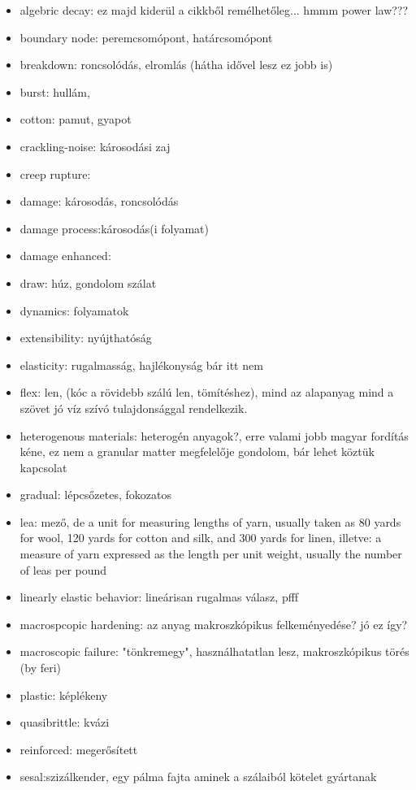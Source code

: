 \begin{itemize}
\item algebric decay: ez majd kiderül a cikkből remélhetőleg...	hmmm power law???
\item boundary node: peremcsomópont, határcsomópont
\item breakdown: roncsolódás, elromlás (hátha idővel lesz ez jobb is)
\item burst: hullám,
\item cotton: pamut, gyapot
\item crackling-noise: károsodási zaj
\item creep rupture:
\item damage: károsodás, roncsolódás
\item damage process:károsodás(i folyamat)
\item damage enhanced:
\item draw: húz, gondolom szálat
\item dynamics: folyamatok
\item extensibility: nyújthatóság
\item elasticity: rugalmasság, hajlékonyság bár itt nem
\item flex: len, (kóc a rövidebb szálú len, tömítéshez), mind az alapanyag mind a szövet jó víz szívó tulajdonsággal rendelkezik.
\item heterogenous materials: heterogén anyagok?, erre valami jobb magyar fordítás kéne, ez nem a granular matter megfelelője gondolom, bár lehet köztük kapcsolat
\item gradual: lépcsőzetes, fokozatos
\item lea: mező, de a unit for measuring lengths of yarn, usually taken as 80 yards for wool, 120 yards for cotton and silk, and 300 yards for linen, illetve: a measure of yarn expressed as the length per unit weight, usually the number of leas per pound
\item linearly elastic behavior: lineárisan rugalmas válasz, pfff
\item macrospcopic hardening: az anyag makroszkópikus felkeményedése? jó ez így?
\item macroscopic failure: "tönkremegy", használhatatlan lesz, makroszkópikus törés (by feri)
\item plastic: képlékeny
\item quasibrittle: kvázi
\item reinforced: megerősített
\item sesal:szizálkender, egy pálma fajta aminek a szálaiból kötelet gyártanak

\end{itemize}
